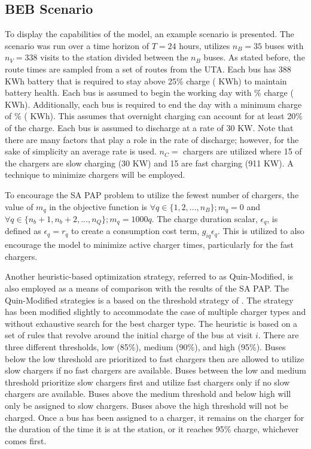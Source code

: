 \documentclass[11pt,a4paper,final]{article}
\newcommand{\A}{35 }                                                            %
\newcommand{\N}{338 }                                                           %
\newcommand{\acharge}{0.9}                                                      %
\newcommand{\bcharge}{0.7 }                                                     %
\newcommand{\mincharge}{25\% }                                                  %
\newcommand{\minchargeD}{0.25 }                                                 %
\newcommand{\batsize}{388 }                                                     %
\newcommand{\fast}{15 }                                                         %
\newcommand{\slow}{15 }                                                         %
\newcommand{\fasts}{911 }                                                       %
\newcommand{\slows}{30 }                                                        %
\begin{document}
\subsection{BEB Scenario}
\label{beb-scenario}
To display the capabilities of the model, an example scenario is presented. The scenario was run over a time horizon of
\(T=24\) hours, utilizes \(n_B = \A\) buses with \(n_V = \N\) visits to the station divided between the \(n_B\) buses. As stated
before, the route times are sampled from a set of routes from the UTA. Each bus has \batsize KWh battery that is
required to stay above \mincharge charge (\fpeval{\batsize * \minchargeD} KWh) to maintain battery health. Each bus is
assumed to begin the working day with \fpeval{\acharge*100}\% charge (\fpeval{\acharge * \batsize} KWh). Additionally,
each bus is required to end the day with a minimum charge of \fpeval{\bcharge * 100}\% (\fpeval{\bcharge * \batsize}
KWh). This assumes that overnight charging can account for at least 20\% of the charge. Each bus is assumed to discharge
at a rate of 30 KW. Note that there are many factors that play a role in the rate of discharge; however, for the sake of
simplicity an average rate is used. \(n_C =\) \fpeval{\fast + \slow} chargers are utilized where \slow of the chargers are
slow charging (\slows KW) and \fast are fast charging (\fasts KW). A technique to minimize chargers will be employed.

To encourage the SA PAP problem to utilize the fewest number of chargers, the value of \(m_q\) in the objective function
is \(\forall q \in \{1,2,..., n_B \}; m_q = 0\) and \(\forall q \in \{n_b + 1, n_b + 2,..., n_Q \}; m_q = 1000q\). The charge duration
scalar, \(\epsilon_q\), is defined as \(\epsilon_q = r_q\) to create a consumption cost term, \(g_{iq}\epsilon_q\). This is utilized to also
encourage the model to minimize active charger times, particularly for the fast chargers.

Another heuristic-based optimization strategy, referred to as Quin-Modified, is also employed as a means of comparison
with the results of the SA PAP. The Quin-Modified strategies is a based on the threshold strategy of
\cite{qin-2016-numer-analy}. The strategy has been modified slightly to accommodate the case of multiple charger types
and without exhaustive search for the best charger type. The heuristic is based on a set of rules that revolve around
the initial charge of the bus at visit \(i\). There are three different thresholds, low (85\%), medium (90\%), and high
(95\%). Buses below the low threshold are prioritized to fast chargers then are allowed to utilize slow chargers if no
fast chargers are available. Buses between the low and medium threshold prioritize slow chargers first and utilize fast
chargers only if no slow chargers are available. Buses above the medium threshold and below high will only be assigned
to slow chargers. Buses above the high threshold will not be charged. Once a bus has been assigned to a charger, it
remains on the charger for the duration of the time it is at the station, or it reaches 95\% charge, whichever comes
first.
\end{document}
